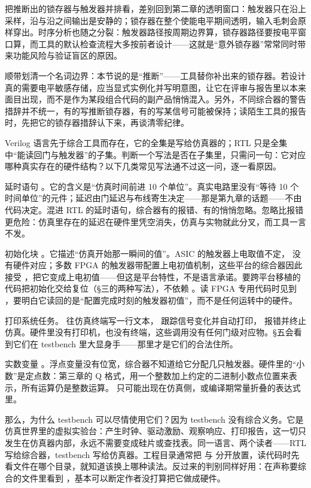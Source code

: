 把推断出的锁存器与触发器并排看，差别回到第二章的透明窗口：触发器只在沿上采样，沿与沿之间输出是安静的；锁存器在整个使能电平期间透明，输入毛刺会原样穿出。时序分析也随之分裂：触发器路径按周期边界算，锁存器路径要按电平窗口算，而工具的默认检查流程大多按前者设计——这就是“意外锁存器”常常同时带来功能风险与验证盲区的原因。

顺带划清一个名词边界：本节说的是“推断”——工具替你补出来的锁存器。若设计真的需要电平敏感存储，应当显式实例化并写明意图，让它在评审与报告里以本来面目出现，而不是作为某段组合代码的副产品悄悄混入。另外，不同综合器的警告措辞并不统一，有的写推断锁存器，有的写某信号可能被保持；读陌生工具的报告时，先把它的锁存器措辞认下来，再谈清零纪律。


Verilog 语言先于综合工具而存在，它的全集是写给仿真器的；RTL 只是全集中“能读回门与触发器”的子集。判断一个写法是否在子集里，只需问一句：它对应哪种真实存在的硬件结构？以下几类常见写法通不过这一问，逐一看原因。

延时语句 。它的含义是“仿真时间前进 10 个单位”。真实电路里没有“等待 10 个时间单位”的元件；延迟由门延迟与布线寄生决定——那是第九章的话题——不由代码决定。混进 RTL 的延时语句，综合器有的报错、有的悄悄忽略。忽略比报错更危险：仿真里存在的延迟在硬件里凭空消失，仿真与实物就此分叉，而工具一言不发。

初始化块 。它描述“仿真开始那一瞬间的值”。ASIC 的触发器上电取值不定， 没有硬件对应；多数 FPGA 的触发器带配置上电初值机制，这些平台的综合器因此接受 ，把它变成上电初值——但这是平台特性，不是语言承诺。要跨平台移植的代码把初始化交给复位（§三的两种写法），不依赖 。读 FPGA 专用代码时见到 ，要明白它读回的是“配置完成时刻的触发器初值”，而不是任何运转中的硬件。

打印系统任务。 往仿真终端写一行文本， 跟踪信号变化并自动打印， 报错并终止仿真。硬件里没有打印机，也没有终端，这些调用没有任何门级对应物。§五会看到它们在 testbench 里大显身手——那里才是它们的合法住所。

实数变量 。浮点变量没有位宽，综合器不知道给它分配几只触发器。硬件里的“小数”是定点数：第三章的 Q 格式，用一个整数加上约定的二进制小数点位置来表示，所有运算仍是整数运算。 只可能出现在仿真侧，或编译期常量折叠的表达式里。

那么，为什么 testbench 可以尽情使用它们？因为 testbench 没有综合义务。它是仿真世界里的虚拟实验台：产生时钟、驱动激励、观察响应、打印报告，这一切只发生在仿真器内部，永远不需要变成硅片或查找表。同一语言、两个读者——RTL 写给综合器，testbench 写给仿真器。工程目录通常把  与  分开放置，读代码时先看文件在哪个目录，就知道该换上哪种读法。反过来的判别同样好用：在声称要综合的文件里看到 ，基本可以断定作者没打算把它做成硬件。

